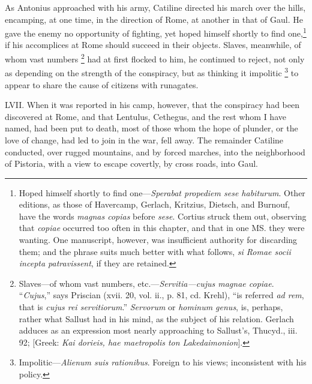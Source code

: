 As Antonius approached with his army, Catiline directed his march over
the hills, encamping, at one time, in the direction of Rome, at
another in that of Gaul. He gave the enemy no opportunity of fighting,
yet hoped himself shortly to find one,\footnote{Hoped himself shortly to find one—\emph{Sperabat propediem sese
habiturum}. Other editions, as those of Havercamp, Gerlach, Kritzius,
Dietsch, and Burnouf, have the words \emph{magnas copias} before \emph{sese}.
Cortius struck them out, observing that \emph{copiae} occurred too often in
this chapter, and that in one MS. they were wanting. One manuscript,
however, was insufficient authority for discarding them; and the
phrase suits much better with what follows, \emph{si Romae socii incepta
patravissent}, if they are retained.} if his accomplices at Rome
should succeed in their objects. Slaves, meanwhile, of whom vast numbers
\footnote{Slaves—of whom vast numbers, etc.—\emph{Servitia—cujus magnae
copiae}. ``\emph{Cujus},'' says Priscian (xvii. 20, vol. ii., p. 81, cd. Krehl),
``is referred \emph{ad rem}, that is \emph{cujus rei servitiorum}.'' \emph{Servorum} or
\emph{hominum genus}, is, perhaps, rather what Sallust had in his mind, as
the subject of his relation. Gerlach adduces as an expression most
nearly approaching to Sallust's, Thucyd., iii. 92; [Greek: \emph{Kai dorieis,
hae maetropolis ton Lakedaimonion}].} had at first flocked to him, he continued to reject, not only as
depending on the strength of the conspiracy, but as thinking it impolitic
\footnote{Impolitic—\emph{Alienum suis rationibus}. Foreign to his views;
inconsistent with his policy.} to appear to share the cause of citizens with runagates.

LVII. When it was reported in his camp, however, that the conspiracy
had been discovered at Rome, and that Lentulus, Cethegus, and the rest
whom I have named, had been put to death, most of those whom the hope
of plunder, or the love of change, had led to join in the war, fell
away. The remainder Catiline conducted, over rugged mountains, and by
forced marches, into the neighborhood of Pistoria, with a view to
escape covertly, by cross roads, into Gaul.

